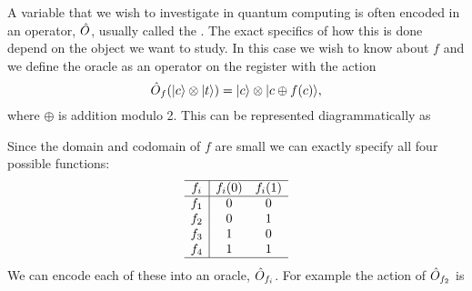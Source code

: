     A variable that we wish to investigate in quantum computing is often encoded in an operator, \(\hat{O}\), usually called the .
    The exact specifics of how this is done depend on the object we want to study.
    In this case we wish to know about \(f\) and we define the oracle as an operator on the register with the action
    \[\hat{O}_f (\vert {c} \rangle\otimes\vert {t} \rangle) = \vert {c} \rangle\otimes\vert {c \oplus f(c)} \rangle,\]
    where \(\oplus\) is addition modulo 2.
    This can be represented diagrammatically as
    \begin{center}
    \end{center}
    Since the domain and codomain of \(f\) are small we can exactly specify all four possible functions:
    \[
        \begin{array}{c|cc}\hline
            f_i & f_i(0) & f_i(1)\\\hline
            f_1 & 0 & 0\\
            f_2 & 0 & 1\\
            f_3 & 1 & 0\\
            f_4 & 1 & 1\\\hline
        \end{array}
    \]
    We can encode each of these into an oracle, \(\hat{O}_{f_i}\).
    For example the action of \(\hat{O}_{f_2}\) is
